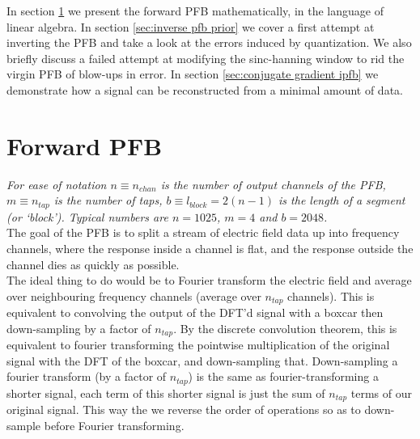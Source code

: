 \documentclass[12pt]{article}
\newcommand{\ntap}{n_{tap}}
\newcommand{\nchan}{n_{chan}}
\newcommand{\lblock}{l_{block}}
\begin{document}
In section \ref{sec:forward pfb} we present the forward PFB mathematically, in the language of linear algebra. In section \ref{sec:inverse pfb prior} we cover a first attempt at inverting the PFB and take a look at the errors induced by quantization. We also briefly discuss a failed attempt at modifying the sinc-hanning window to rid the virgin PFB of blow-ups in error. In section \ref{sec:conjugate gradient ipfb} we demonstrate how a signal can be reconstructed from a minimal amount of data. 

\section{Forward PFB}\label{sec:forward pfb}

\textit{For ease of notation $n \equiv \nchan$ is the number of output channels of the PFB, $m \equiv \ntap$ is the number of taps, $b \equiv \lblock = 2(n-1)$ is the length of a segment (or `block'). Typical numbers are $n=1025$, $m=4$ and $b=2048$. } \\

The goal of the PFB is to split a stream of electric field data up into frequency channels, where the response inside a channel is flat, and the response outside the channel dies as quickly as possible. \\

The ideal thing to do would be to Fourier transform the electric field and average over neighbouring frequency channels (average over $\ntap$ channels). This is equivalent to convolving the output of the DFT'd signal with a boxcar then down-sampling by a factor of $\ntap$. By the discrete convolution theorem, this is equivalent to fourier transforming the pointwise multiplication of the original signal with the DFT of the boxcar, and down-sampling that. Down-sampling a fourier transform (by a factor of $\ntap$) is the same as fourier-transforming a shorter signal, each term of this shorter signal is just the sum of $\ntap$ terms of our original signal. This way the we reverse the order of operations so as to down-sample before Fourier transforming. \\
\end{document}
